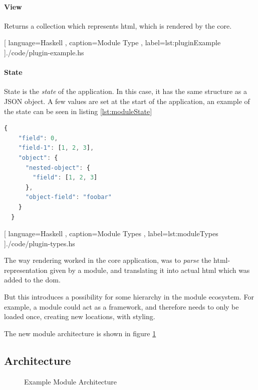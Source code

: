 \paragraph{View} Returns a collection which represents \gls{html},
which is rendered by the core.

\begin{center}
  
    [ language=Haskell
    , caption={Module Type}
    , label=lst:pluginExample
    ]{./code/plugin-example.hs}
\end{center}

\paragraph{State}
State is the \textit{state} of the application. In this case, it has the same
structure as a JSON object. A few values are set at the start of the
application, an example of the state can be seen in listing
\ref{lst:moduleState}

\begin{lstlisting}[language=JavaScript, caption={State Example}, label=lst:moduleState]
  {
    "field": 0,
    "field-1": [1, 2, 3],
    "object": {
      "nested-object": {
        "field": [1, 2, 3]
      },
      "object-field": "foobar"
    }
  }
\end{lstlisting}

\begin{center}
  
    [ language=Haskell
    , caption={Module Types}
    , label=lst:moduleTypes
    ]{./code/plugin-types.hs}
\end{center}

The way rendering worked in the core application, was to \textit{parse} the
\gls{html}-representation given by a module, and translating it into actual
\gls{html} which was added to the \gls{dom}.


But this introduces a possibility for some hierarchy in the module ecosystem.
For example, a module could act as a framework, and therefore needs to only be
loaded once, creating new locations, with styling.

The new module architecture is shown in figure
\ref{fig:moduleArchitecture}

\subsection{Architecture}
\begin{figure}
  \centering
  
  \caption{Example Module Architecture}
  \label{fig:moduleArchitecture}
\end{figure}

